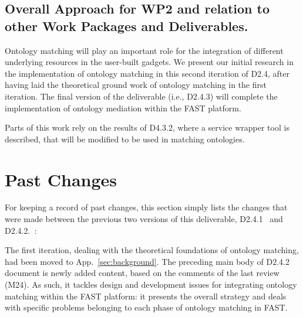 \documentclass{fast_latex}
\begin{document}
\subsection{Overall Approach for WP2 and relation to other Work Packages and Deliverables.}
Ontology matching will play an important role for the integration of different underlying resources in the user-built gadgets. 
We present our initial research in the implementation of ontology matching in this second iteration of D2.4, after having laid the theoretical ground work of ontology matching in the first iteration. The final version of the deliverable (i.e., D2.4.3) will complete the implementation of ontology mediation within the FAST platform. 

Parts of this work rely on the results of D4.3.2, where a service wrapper tool is described, that will be modified to be used in matching ontologies.






\clearpage
{}
\appendix




\clearpage
{}
\section{Past Changes} %
\label{sec:old_changes}

For keeping a record of past changes, this section simply lists the changes that were made between the previous two versions of this deliverable, D2.4.1~\cite{ambrus2009mediation} and D2.4.2.~\cite{ambrus2010mediation}:

The first iteration, dealing with the theoretical foundations of ontology matching, had been moved to App.~\ref{sec:background}. The preceding main body of D2.4.2 document is newly added content, based on the comments of the last review (M24). As such, it tackles design and development issues for integrating ontology matching within the FAST platform: it presents the overall strategy and deals with specific problems belonging to each phase of ontology matching in FAST.


\clearpage


\end{document}
